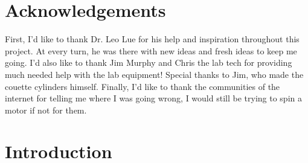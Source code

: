 \documentclass[twoside,a4]{report}
\def\br{\newline \newline \noindent}
\def\achapter{preamble}  %
\begin{document}
	\chapter*{Acknowledgements}
	\def\achapter{Acknowledgements}
	First, I'd like to thank Dr. Leo Lue for his help and inspiration throughout this project. At every turn, he was there with new ideas and fresh ideas to keep me going. \br
	I'd also like to thank Jim Murphy and Chris the lab tech for providing much needed help with the lab equipment! Special thanks to Jim, who made the couette cylinders himself. \br
	Finally, I'd like to thank the communities of the internet for telling me where I was going wrong, I would still be trying to spin a motor if not for them.
	
	\newpage
	\setcounter{page}{1}
	
                                                               
	\chapter*{Introduction}
	\def\achapter{Introduction}
\end{document}
